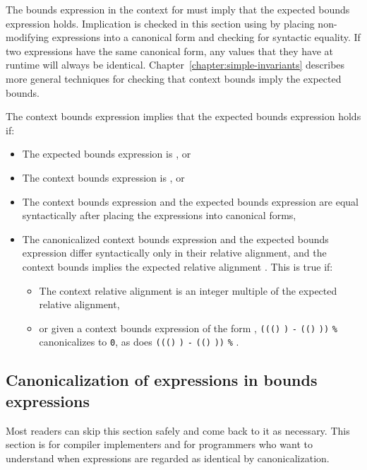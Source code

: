 The bounds expression in the context for  must imply that the
expected bounds expression holds. Implication is checked in this section
using by placing non-modifying expressions into a canonical form and
checking for syntactic equality. If two expressions have the same
canonical form, any values that they have at runtime will always be
identical. Chapter~\ref{chapter:simple-invariants}
describes more general techniques for checking
that context bounds imply the expected bounds.

The context bounds expression implies that the expected bounds
expression holds if:

\begin{itemize}
\item
  The expected bounds expression is \boundsnone, or
\item
  The context bounds expression is \boundsany, or
\item
  The context bounds expression and the expected bounds expression are
  equal syntactically after placing the expressions into canonical
  forms,
\item
  The canonicalized context bounds expression and the expected bounds
  expression differ syntactically only in their relative alignment, and
  the context bounds implies the expected relative alignment .
  This is true if:

  \begin{itemize}
  \item
    The context relative alignment is an integer multiple of the
    expected relative alignment,
  \item
    or given a context bounds expression of the form
    ,
    \texttt{(((\arrayptrchar)}
    \texttt{)} \texttt{-}
    \texttt{((\arrayptrchar)}
    \texttt{))} \texttt{\%}  canonicalizes to
    \texttt{0}, as does
    \texttt{(((\arrayptrchar)}
    \texttt{)} \texttt{-}
    \texttt{((\arrayptrchar)}
    \texttt{))} \texttt{\%} .
  \end{itemize}
\end{itemize}

\subsection{Canonicalization of expressions in bounds expressions}

Most readers can skip this section safely and come back to it as
necessary. This section is for compiler implementers and for programmers
who want to understand when expressions are regarded as identical by
canonicalization.

